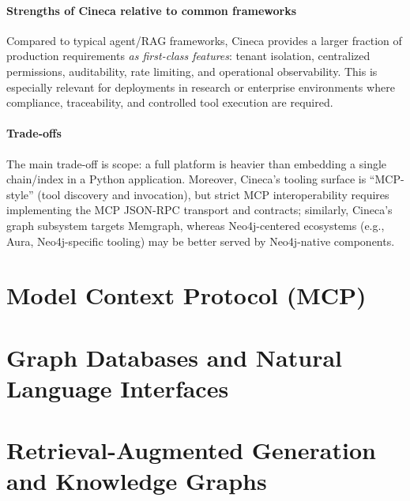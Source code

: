 \documentclass[a4paper,twoside]{sapthesis}
\begin{document}
\paragraph{Strengths of Cineca relative to common frameworks}
Compared to typical agent/RAG frameworks, Cineca provides a larger fraction of production requirements
\emph{as first-class features}: tenant isolation, centralized permissions, auditability, rate limiting,
and operational observability. This is especially relevant for deployments in research or enterprise environments
where compliance, traceability, and controlled tool execution are required.

\paragraph{Trade-offs}
The main trade-off is scope: a full platform is heavier than embedding a single chain/index in a Python application.
Moreover, Cineca's tooling surface is ``MCP-style'' (tool discovery and invocation), but strict MCP interoperability
requires implementing the MCP JSON-RPC transport and contracts; similarly, Cineca's graph subsystem targets Memgraph,
whereas Neo4j-centered ecosystems (e.g., Aura, Neo4j-specific tooling) may be better served by Neo4j-native components.

\section{Model Context Protocol (MCP)}
\label{sec:mcp-background}

\section{Graph Databases and Natural Language Interfaces}
\label{sec:graph-databases}

\section{Retrieval-Augmented Generation and Knowledge Graphs}
\label{sec:rag-kg}
\end{document}
